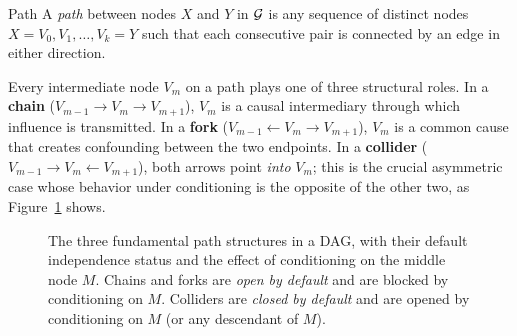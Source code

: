 \documentclass[master.tex]{subfiles}
\begin{document}
\begin{defn}{Path}
A \emph{path} between nodes $X$ and $Y$ in $\mathcal{G}$ is any sequence of
distinct nodes $X = V_0, V_1, \dots, V_k = Y$ such that each consecutive pair
is connected by an edge in either direction.
\end{defn}

Every intermediate node $V_m$ on a path plays one of three structural roles.
In a \textbf{chain} ($V_{m-1} \to V_m \to V_{m+1}$), $V_m$ is a causal
intermediary through which influence is transmitted.  In a \textbf{fork}
($V_{m-1} \leftarrow V_m \to V_{m+1}$), $V_m$ is a common cause that
creates confounding between the two endpoints.  In a \textbf{collider}
($V_{m-1} \to V_m \leftarrow V_{m+1}$), both arrows point \emph{into}
$V_m$; this is the crucial asymmetric case whose behavior under
conditioning is the opposite of the other two, as
Figure~\ref{w2:fig:chain-fork-collider} shows.

\begin{figure}[t]
\centering
{}
\caption{The three fundamental path structures in a DAG, with their default
independence status and the effect of conditioning on the middle node $M$.
Chains and forks are \emph{open by default} and are blocked by conditioning
on $M$.  Colliders are \emph{closed by default} and are opened by
conditioning on $M$ (or any descendant of $M$).}
\label{w2:fig:chain-fork-collider}
\end{figure}
\end{document}
